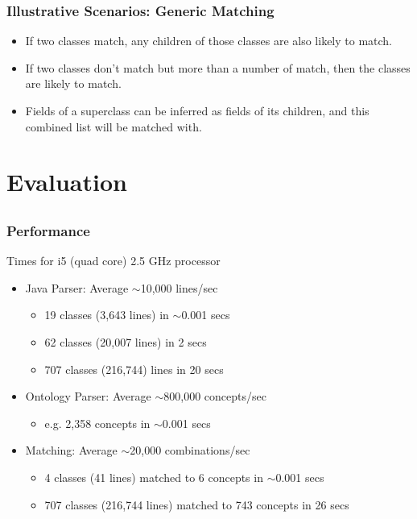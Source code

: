 \documentclass{beamer}
\newcommand{\myemph}[1]{{\bf {\color{emcolor}{#1}}}}
\begin{document}
\begin{frame}
\frametitle{Illustrative Scenarios: Generic Matching}
      \begin{itemize}
      \item If two classes match, any children of those classes are also likely to match.
      \item If two classes don't match but more than a number of \myemph{fields} match, then the classes are likely to match.
      \item Fields of a superclass can be inferred as fields of its children, and this combined list will be matched with.
      \end{itemize}
\end{frame}

\section{Evaluation}
\subsection{}

\begin{frame}
\frametitle{Performance}
Times for i5 (quad core) 2.5 GHz processor
\begin{itemize}
\item Java Parser: Average $\sim$10,000 lines/sec
	\begin{itemize}
    	\item 19 classes (3,643 lines) in $\sim$0.001 secs
        \item 62 classes (20,007 lines) in 2 secs
        \item 707 classes (216,744) lines in 20 secs
    \end{itemize}
\item Ontology Parser: Average $\sim$800,000 concepts/sec 
	\begin{itemize}
        \item e.g. 2,358 concepts in $\sim$0.001 secs
	\end{itemize}
\item Matching: Average $\sim$20,000 combinations/sec
	\begin{itemize}
    	\item 4 classes (41 lines) matched to 6 concepts in $\sim$0.001 secs
        \item 707 classes (216,744 lines) matched to 743 concepts in 26 secs
	\end{itemize}
\end{itemize}
\end{frame}
\end{document}
